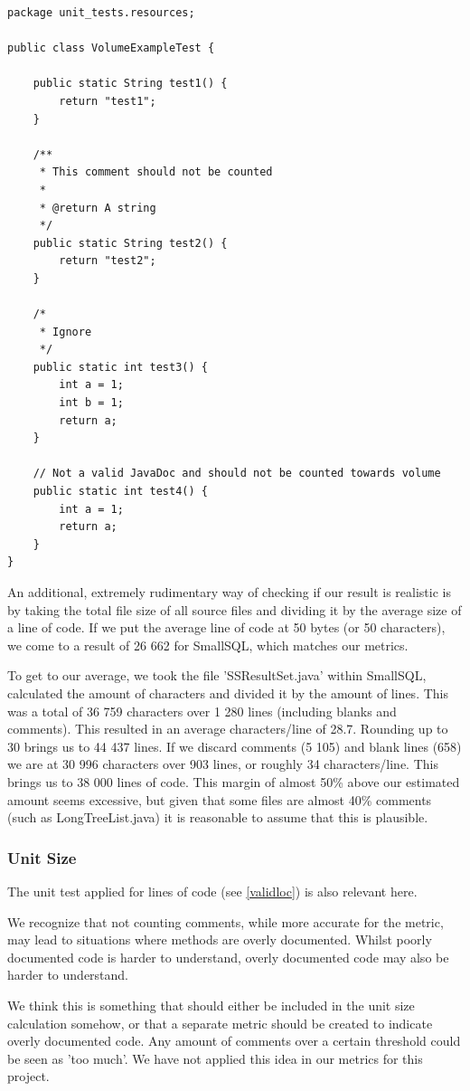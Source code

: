\documentclass{article}
\begin{document}
\begin{lstlisting}
package unit_tests.resources;

public class VolumeExampleTest {
	
	public static String test1() {
		return "test1";
	}
	
	/**
	 * This comment should not be counted
	 * 
	 * @return A string
	 */
	public static String test2() {
		return "test2";
	}
	
	/*
	 * Ignore
	 */
	public static int test3() {
		int a = 1;
		int b = 1;
		return a;
	}
	
	// Not a valid JavaDoc and should not be counted towards volume
	public static int test4() {
		int a = 1;
		return a;
	}
}
\end{lstlisting}

An additional, extremely rudimentary way of checking if our result is realistic is by taking the total file size of all source files and dividing it by the average size of a line of code. If we put the average line of code at 50 bytes (or 50 characters), we come to a result of 26 662 for SmallSQL, which matches our metrics.

To get to our average, we took the file 'SSResultSet.java' within SmallSQL, calculated the amount of characters and divided it by the amount of lines. This was a total of 36 759 characters over 1 280 lines (including blanks and comments). This resulted in an average characters/line of 28.7. Rounding up to 30 brings us to 44 437 lines. If we discard comments (5 105) and blank lines (658) we are at 30 996 characters over 903 lines, or roughly 34 characters/line. This brings us to 38 000 lines of code. This margin of almost 50\% above our estimated amount seems excessive, but given that some files are almost 40\% comments (such as LongTreeList.java) it is reasonable to assume that this is plausible.

\subsubsection{Unit Size} \label{validunitsize}
The unit test applied for lines of code (see \ref{validloc}) is also relevant here.

We recognize that not counting comments, while more accurate for the metric, may lead to situations where methods are overly documented. Whilst poorly documented code is harder to understand, overly documented code may also be harder to understand.

We think this is something that should either be included in the unit size calculation somehow, or that a separate metric should be created to indicate overly documented code. Any amount of comments over a certain threshold could be seen as 'too much'. We have not applied this idea in our metrics for this project.
\end{document}

